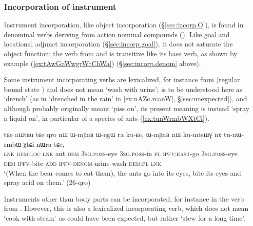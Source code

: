 \subsubsection{Incorporation of instrument} \label{sec:incorp.instr}
Instrument incorporation, like object incorporation (§\ref{sec:incorp.O}), is found in denominal verbs deriving from action nominal compounds (). Like goal and locational adjunct incorporation (§\ref{sec:incorp.goal}), it does not saturate the object function: the verb  from  and  is transitive like its base verb, as shown by example (\ref{ex:tAwGnWwgrWtChWa}) (§\ref{sec:incorp.denom} above).

Some instrument incorporating verbs are lexicalized, for instance  from  (regular bound state ) and  does not mean `wash with urine';  is to be understood here as `drench' (as in `drenched in the rain' in \ref{ex:nAZo.rcanW}, §\ref{sec:unexpected}), and although  probably originally meant `piss on', its present meaning is instead `spray a liquid on', in particular of a species of ants (\ref{ex:tunWrmbWXtCi}).

\begin{exe}
\ex \label{ex:tunWrmbWXtCi}
\gll tɕe nɯtɕu tɕe qro nɯ ɯ-mɲaʁ ɯ-ŋgɯ ra ku-ɕe, ɯ-mɲaʁ nɯ ku-mtsɯɣ nɤ tu-nɯ-rmbɯ-χtɕi nɯra tɕe, \\
\textsc{lnk} \textsc{dem}:\textsc{loc} \textsc{lnk} ant \textsc{dem} \textsc{3sg}.\textsc{poss}-eye \textsc{3sg}.\textsc{poss}-in \textsc{pl} \textsc{ipfv}:\textsc{east}-go \textsc{3sg}.\textsc{poss}-eye \textsc{dem} \textsc{ipfv}-bite \textsc{add} \textsc{ipfv}-\textsc{denom}-urine-wash \textsc{dem}:\textsc{pl} \textsc{lnk}  \\
\glt `(When the bear comes to eat them), the ants go into its eyes, bite its eyes and spray acid on them.' (26-qro)
\end{exe}

Instruments other than body parts can be incorporated, for instance  in the verb  from . However, this is also a lexicalized incorporating verb, which does not mean `cook with steam' as could have been expected, but rather `stew for a long time'. 



